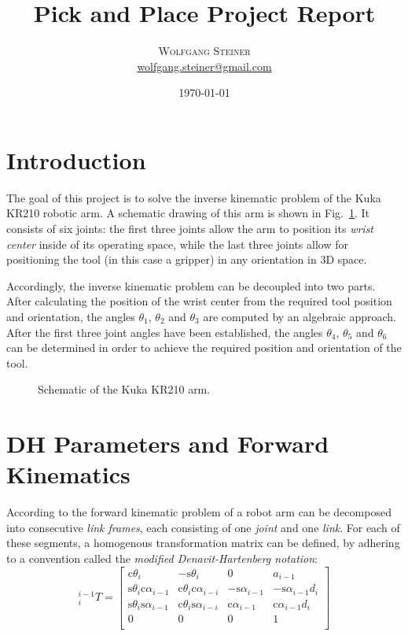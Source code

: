 \documentclass[twoside]{article}
\title{Pick and Place Project Report} %
\author{%
\textsc{Wolfgang Steiner} \\[0.5ex] %
\normalsize \href{mailto:wolfgang.steiner@gmail.com}{wolfgang.steiner@gmail.com} %
}
\date{\today} %
\renewcommand{\c}{\text{c}}
\newcommand{\s}{\text{s}}
\newcommand{\T}[2]{\mbox{$_{#2}^{#1}{T}$}}
\newcommand{\figref}[1]{Fig.~\ref{fig:#1}}
\begin{document}
\maketitle

\section{Introduction}
The goal of this project is to solve the inverse kinematic problem of the Kuka KR210 \cite{kuka}
robotic arm. A schematic drawing of this arm is shown in \figref{schematic}. It consists of six joints:
the first three joints allow the arm to position its \emph{wrist center} inside of its operating
space, while the last three joints allow for positioning the tool (in this case a gripper)
in any orientation in 3D space.

Accordingly, the inverse kinematic problem can be decoupled into two parts. After calculating
the position of the wrist center from the required tool position and orientation, the angles
$\theta_1$, $\theta_2$ and $\theta_3$ are computed by an algebraic approach. After the
first three joint angles have been established, the angles $\theta_4$, $\theta_5$ and $\theta_6$
can be determined in order to achieve the required position and orientation of the tool.
\begin{figure}[ht]
  \centering 
  \caption{Schematic of the Kuka KR210 arm.}
  \label{fig:schematic}
\end{figure}
\section{DH Parameters and Forward Kinematics}
According to \cite{craig_2005} the forward kinematic problem of a robot arm can be decomposed
into consecutive \emph{link frames}, each consisting of one \emph{joint} and one \emph{link}.
For each of these segments, a homogenous transformation matrix can be defined,
by adhering to a convention called the \emph{modified Denavit-Hartenberg notation}:
\begin{equation}
\T{i-1}{i} =
\begin{bmatrix}
  \c\theta_i & -\s\theta_i & 0 & a_{i-1} \\
  \s\theta_i\c\alpha_{i-1} & \c\theta_i\c\alpha_{i-i} & -\s\alpha_{i-1} & -\s\alpha_{i-1}d_i \\
  \s\theta_i\s\alpha_{i-1} & \c\theta_i\s\alpha_{i-i} &  \c\alpha_{i-1} &  \c\alpha_{i-1}d_i \\
  0 & 0 & 0 & 1\\
\end{bmatrix}
\label{eq:dh_transform}
\end{equation}
\end{document}
